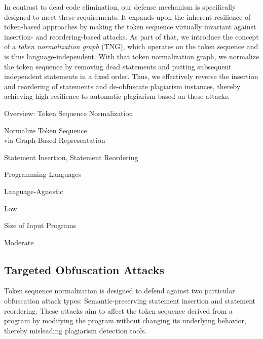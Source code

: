 In contrast to dead code elimination, our defense mechanism is specifically designed to meet these requirements.
It expands upon the inherent resilience of token-based approaches by making the token sequence virtually invariant against insertion- and reordering-based attacks.
As part of that, we introduce the concept of a \textit{token normalization graph} (TNG), which operates on the token sequence and is thus language-independent.
With that token normalization graph, we normalize the token sequence by removing dead statements and putting subsequent independent statements in a fixed order.
Thus, we effectively reverse the insertion and reordering of statements and de-obfuscate plagiarism instances, thereby achieving high resilience to automatic plagiarism based on these attacks.

\begin{factsheet}{Overview: Token Sequence Normalization} 
    \begin{description}[style=multiline,leftmargin=5.5cm]
        \item[Core Principle] Normalize Token Sequence \\via Graph-Based Representation
        \item[Targeted Obfuscation Attack] Statement Insertion, Statement Reordering
        \item[Language Family] Programming Languages
        \item[Language Dependence] Language-Agnostic
        \item[Performance Impact] Low
        \item[Main Scalability Determinant] Size of Input Programs 
        \item[Integration Complexity] Moderate
    \end{description}
\end{factsheet}

\subsection{Targeted Obfuscation Attacks} \label{sec:icseb:RunningExample}

Token sequence normalization is designed to defend against two particular obfuscation attack types: Semantic-preserving statement insertion and statement reordering. These attacks aim to affect the token sequence derived from a program by modifying the program without changing its underlying behavior, thereby misleading plagiarism detection tools. %

